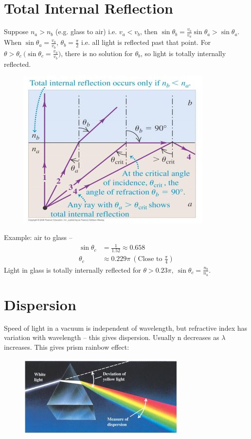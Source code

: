 \documentclass[a4paper, 11pt, normalem]{report}
\begin{document}
\section{Total Internal Reflection}
Suppose $n_{a} > n_{b}$ (e.g. glass to air) i.e. $v_{a} < v_{b}$, then $\sin{\theta_{b}} = \frac{v_{b}}{v_{a}}\sin{\theta_{a}} > \sin{\theta_{a}}$.
When $\sin{\theta_{a}} = \frac{v_{a}}{v_{b}}$, $\theta_{b} = \frac{\pi}{2}$ i.e. all light is reflected past that point.
For $\theta > \theta_{c} ~\big(\sin{\theta_{c}} = \frac{v_{a}}{v_{b}}\big)$, there is no solution for $\theta_{b}$, so light is totally internally reflected.
\begin{figure}[H]
    \centering
    \includegraphics[scale=0.8]{TIR.jpg}
\end{figure}
Example: air to glass --
\begin{align}
    \sin{\theta_{c}} &= \frac{1}{1.52} \approx 0.658 \\
    \theta_{c} &\approx 0.229\pi~(\text{Close to }\frac{\pi}{4})
\end{align}
Light in glass is totally internally reflected for $\theta > 0.23\pi,~\sin{\theta_{c}} = \frac{n_{b}}{n_{a}}$.

\section{Dispersion}
Speed of light in a vacuum is independent of wavelength, but refractive index has variation with wavelength -- this gives dispersion.
Usually n decreases as $\lambda$ increases.
This gives prism rainbow effect: 
\begin{figure}[H]
    \centering
    \includegraphics[scale=0.8]{PF.jpg}
\end{figure}
\end{document}
